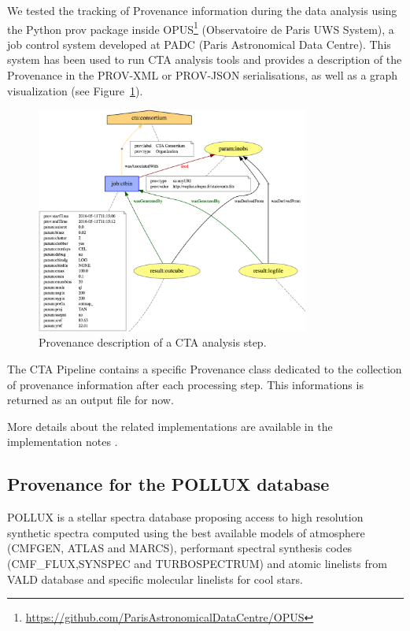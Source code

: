 We tested the tracking of Provenance information during the data analysis using the Python prov package inside OPUS\footnote{\url{https://github.com/ParisAstronomicalDataCentre/OPUS}} (Observatoire de Paris UWS System), a job control system developed at PADC (Paris Astronomical Data Centre). This system has been used to run CTA analysis tools and provides a description of the Provenance in the PROV-XML or PROV-JSON serialisations, as well as a graph visualization (see Figure~\ref{fig:cta_prov}).

\begin{figure}
\centering
\includegraphics[width=0.8\textwidth]{CTA_prov.png}
\caption{Provenance description of a CTA analysis step.}
\label{fig:cta_prov}
\end{figure}

The CTA Pipeline contains a specific Provenance class dedicated to the collection of provenance information after each processing step. This informations is returned as an output file for now.

More details about the related implementations are available in the implementation notes \citep{std:ProvenanceImplementationNote}.


\subsection{Provenance for the POLLUX database}

POLLUX is a stellar spectra database proposing access to high resolution synthetic spectra computed using the best available models of atmosphere (CMFGEN, ATLAS and MARCS), performant spectral synthesis codes (CMF\_FLUX,SYNSPEC and TURBOSPECTRUM) and atomic linelists from VALD database and specific molecular linelists for cool stars. 

